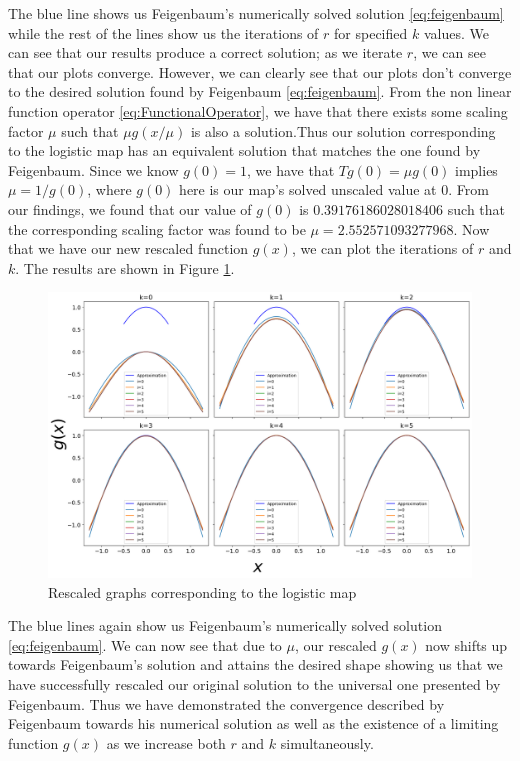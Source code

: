 \begin{exmp}
    The blue line shows us Feigenbaum's numerically solved solution \eqref{eq:feigenbaum} while the rest of the lines show us the iterations of $r$ for specified $k$ values. 
	We can see that our results produce a correct solution; as we iterate $r$, we can see that our plots converge. However, we can clearly see that our plots don't converge to the desired solution found by Feigenbaum \eqref{eq:feigenbaum}. From the non linear function operator \eqref{eq:FunctionalOperator}, we have that there exists some scaling factor $\mu$ such that $\mu g(x/\mu)$ is also a solution.Thus our solution corresponding to the logistic map has an equivalent solution that matches the one found by Feigenbaum. Since we know $g(0)=1$, we have that $Tg(0)=\mu g(0)$ implies $\mu = 1/g(0)$, where $g(0)$ here is our map's solved unscaled value at 0. 
    From our findings, we found that our value of $g(0)$ is $0.39176186028018406$ such that the corresponding scaling factor was found to be $\mu= 2.552571093277968$. Now that we have our new rescaled function $g(x)$, we can plot the iterations of $r$ and $k$. The results are shown in Figure \ref{fig:rescaled}.
    \begin{figure}
    \centering
    \includegraphics[width=1\textwidth]{Feigenbaum Approx Graphs/Images/fiegenbaum_scaled.png}
    \caption{Rescaled graphs corresponding to the logistic map}
    \label{fig:rescaled}
\end{figure}
The blue lines again show us Feigenbaum's numerically solved solution \eqref{eq:feigenbaum}. We can now see that due to $\mu$, our rescaled $g(x)$ now shifts up towards Feigenbaum's solution and attains the desired shape showing us that we have successfully rescaled our original solution to the universal one presented by Feigenbaum. Thus we have demonstrated the convergence described by Feigenbaum towards his numerical solution as well as the existence of a limiting function $g(x)$ as we increase both $r$ and $k$ simultaneously. 
\end{exmp}


